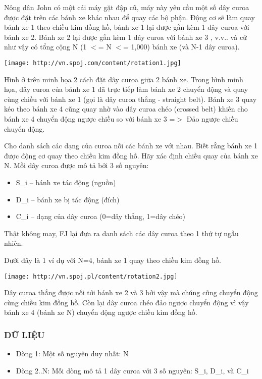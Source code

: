 



   Nông dân John có một cái máy gặt đập cũ, máy này yêu cầu một số dây  curoa được đặt trên các bánh xe khác nhau để quay các bộ phận. Động cơ sẽ làm quay bánh xe 1 theo chiều kim đồng hồ, bánh xe 1 lại được gắn kèm 1  dây curoa với bánh xe 2. Bánh xe 2 lại được gắn kèm 1 dây curoa với bánh xe 3  , v.v.. và cứ như vậy có tổng cộng N (1 $<$= N $<$= 1,000) bánh xe (và N-1 dây curoa).  


\texttt{[image: http://vn.spoj.com/content/rotation1.jpg]}

   Hình ở trên minh họa 2 cách đặt dây curoa giữa 2 bánh xe. Trong hình minh họa, dây curoa của bánh xe 1 đã trực tiếp làm bánh xe 2 chuyển động và quay cùng chiều với bánh xe 1 (gọi là dây curoa thẳng - straight belt). Bánh xe 3 quay kéo theo bánh xe 4 cũng quay nhờ vào dây curoa chéo (crossed belt) khiến cho bánh xe 4 chuyển động ngược chiều so với bánh xe 3 =$>$ Đảo  ngược chiều chuyển động.  

   Cho danh sách các dạng của curoa nối các bánh xe với nhau.  Biết rằng bánh xe 1 được động cơ quay theo chiều kim đồng hồ. Hãy xác định chiều quay của bánh xe N. Mỗi dây curoa được mô tả bởi 3 số nguyên:  
\begin{itemize}
	\item     S\_i -- bánh xe tác động (nguồn)   
	\item     D\_i -- bánh xe bị tác động (đích)   
	\item     C\_i -- dạng của dây curoa (0=dây thẳng, 1=dây chéo)   
\end{itemize}

   Thật không may, FJ lại đưa ra danh sách các dây curoa theo 1 thứ tự ngẫu nhiên.  

   Dưới đây là 1 ví dụ với N=4, bánh xe 1 quay theo chiều kim đồng hồ.  


\texttt{[image: http://vn.spoj.pl/content/rotation2.jpg]}

   Dây curoa thẳng được nối tới bánh xe 2 và 3 bởi vậy mà chúng cũng chuyển động cùng chiều kim đồng hồ. Còn lại dây curoa chéo đảo ngược chuyển động vì vậy  bánh xe 4 (bánh xe N) chuyển động ngược chiều kim đồng hồ.  

\subsubsection{   DỮ LIỆU  }
\begin{itemize}
	\item     Dòng 1: Một số nguyên duy nhất: N   
	\item     Dòng 2..N: Mỗi dòng mô tả 1 dây curoa với 3 số nguyên: S\_i, D\_i, và C\_i   
\end{itemize}

